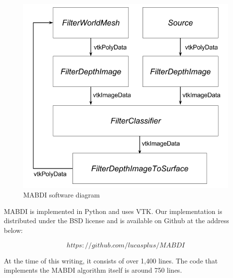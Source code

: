 \begin{figure}[h]%
\centering
\includegraphics[width=.75\textwidth]{figures/diagram_software.png}
\caption{MABDI software diagram}
\label{fig:software}
\end{figure}

MABDI is implemented in Python and uses VTK. Our implementation is distributed
under the BSD license and is available on Github at the address below:

$$
https://github.com/lucasplus/MABDI
$$

At the time of this writing, it consists of over 1,400 lines. The code that
implements the MABDI algorithm itself is around 750 lines.
